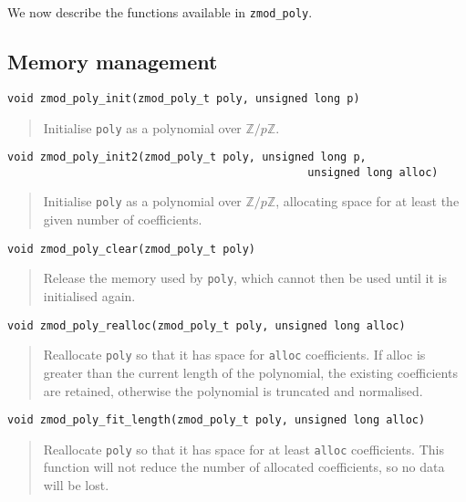 \documentclass[a4paper,10pt]{article}
\newcommand{\Z}{\mathbb{Z}}
\newcommand{\code}{\lstinline}
\begin{document}
We now describe the functions available in \code{zmod_poly}.

\subsection{Memory management}

\begin{lstlisting}
void zmod_poly_init(zmod_poly_t poly, unsigned long p)
\end{lstlisting}
\begin{quote}
Initialise \code{poly} as a polynomial over $\Z/p\Z$. 
\end{quote}

\begin{lstlisting}
void zmod_poly_init2(zmod_poly_t poly, unsigned long p, 
                                              unsigned long alloc)
\end{lstlisting}
\begin{quote}
Initialise \code{poly} as a polynomial over $\Z/p\Z$, allocating space for at least the given number of coefficients. 
\end{quote}

\begin{lstlisting}
void zmod_poly_clear(zmod_poly_t poly)
\end{lstlisting}
\begin{quote}
Release the memory used by \code{poly}, which cannot then be used until it is initialised again.
\end{quote}

\begin{lstlisting}
void zmod_poly_realloc(zmod_poly_t poly, unsigned long alloc)
\end{lstlisting}
\begin{quote}
Reallocate \code{poly} so that it has space for \code{alloc} coefficients. If alloc is greater than the current length of the polynomial, the existing coefficients are retained, otherwise the polynomial is truncated and normalised.
\end{quote}

\begin{lstlisting}
void zmod_poly_fit_length(zmod_poly_t poly, unsigned long alloc)
\end{lstlisting}
\begin{quote}
Reallocate \code{poly} so that it has space for at least \code{alloc} coefficients. This function will not reduce the number of allocated coefficients, so no data will be lost.
\end{quote}
\end{document}
